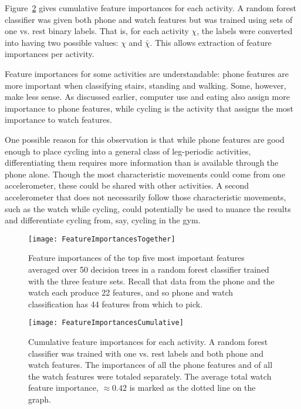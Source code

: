 {{    Figure~\ref{fig:FeatureImportancesCumulative} gives cumulative feature importances for each activity. A random forest classifier was given both phone and watch features but was trained using sets of one vs. rest binary labels. That is, for each activity $\chi$, the labels were converted into having two possible values: $\chi$ and $\bar{\chi}$. This allows extraction of feature importances per activity.
    
    Feature importances for some activities are understandable: phone features are more important when classifying stairs, standing and walking. Some, however, make less sense. As discussed earlier, computer use and eating also assign more importance to phone features, while cycling is the activity that assigns the most importance to watch features.
    
    One possible reason for this observation is that while phone features are good enough to place cycling into a general class of leg-periodic activities, differentiating them requires more information than is available through the phone alone. Though the most characteristic movements could come from one accelerometer, these could be shared with other activities. A second accelerometer that does not necessarily follow those characteristic movements, such as the watch while cycling, could potentially be used to nuance the results and differentiate cycling from, say, cycling in the gym.
    
    \begin{figure}
      \centering
      \texttt{[image: FeatureImportancesTogether]}
      \caption[Feature importances of the top five most important features]{Feature importances of the top five most important features averaged over 50 decision trees in a random forest classifier trained with the three feature sets. Recall that data from the phone and the watch each produce 22 features, and so phone and watch classification has 44 features from which to pick.}
      \label{fig:FeatureImportancesTogether}
    \end{figure}
    
    \begin{figure}
      \centering
      \texttt{[image: FeatureImportancesCumulative]}
      \caption[Cumulative feature importances for each activity]{Cumulative feature importances for each activity. A random forest classifier was trained with one vs. rest labels and both phone and watch features. The importances of all the phone features and of all the watch features were totaled separately. The average total watch feature importance, $\approx 0.42$ is marked as the dotted line on the graph.}
      \label{fig:FeatureImportancesCumulative}
    \end{figure}
}}
